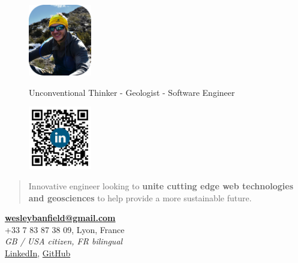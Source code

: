 \documentclass[]{friggeri-cv}
\begin{document}
\begin{figure}[!h]
	\begin{minipage}{0.48\textwidth}
		\begin{flushleft}
			\includegraphics[width=2.75cm]{img/profile_relaxed.png}
		\end{flushleft}
	\end{minipage}\hfill
 	{Unconventional Thinker - Geologist - Software Engineer}
	\begin{minipage}{0.48\textwidth}
		\begin{flushright}
			\includegraphics[width=2.75cm]{img/QR.png}
		\end{flushright}
	\end{minipage}
\end{figure}
\vspace{-0.75cm}

\begin{quote}
\large
\begin{center}
Innovative engineer looking to \textbf{unite cutting edge web technologies and geosciences} to help provide a more sustainable future.
\\
\end{center}
\end{quote}

\begin{center}
\vspace{6pt}
\href{mailto:wesleybanfield@gmail.com}{\textbf{wesleybanfield@gmail.com}}
\\+33 7 83 87 38 09, Lyon, France
\\\emph{GB / USA citizen, FR bilingual}
\vspace{3pt}
\\\href{https://www.linkedin.com/in/wesleybanfield/}{LinkedIn},
\href{https://github.com/WesleyTheGeolien}{GitHub}
\end{center}
\end{document}
